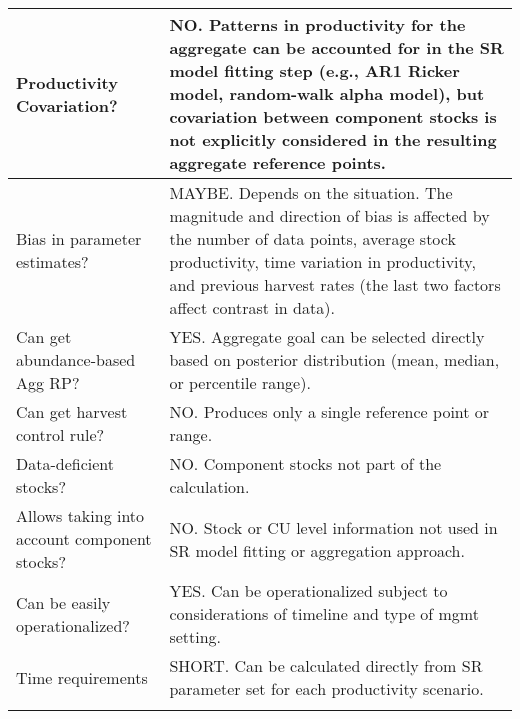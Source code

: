 \documentclass[french,11pt]{book}
\begin{document}
\begin{longtable}[t]{>{\raggedright\arraybackslash}p{9em}>{\raggedright\arraybackslash}p{37em}}
\midrule Productivity Covariation? & NO. Patterns in productivity for the aggregate can be accounted for in the SR model fitting step (e.g., AR1 Ricker model, random-walk alpha model), but covariation between component stocks is not explicitly considered in the resulting aggregate reference points.\\
\midrule Bias in parameter estimates? & MAYBE. Depends on the situation. The magnitude and direction of bias is affected by the number of data points, average stock productivity, time variation in productivity, and previous harvest rates (the last two factors affect contrast in data).\\
\midrule Can get abundance-based Agg RP? & YES.  Aggregate goal can be selected directly based on posterior distribution (mean, median, or percentile range).\\
\midrule Can get harvest control rule? & NO.  Produces only a single reference point or range.\\
\midrule Data-deficient stocks? & NO. Component stocks not part of the calculation.\\
\midrule Allows taking into account component stocks? & NO.  Stock or CU level information not used in SR model fitting or aggregation approach.\\
\midrule Can be easily operationalized? & YES. Can be operationalized subject to considerations of timeline and type of mgmt setting.\\
\midrule Time requirements & SHORT. Can be calculated directly from SR parameter set for each productivity scenario.\\* \end{longtable}

\endgroup{} \endgroup{}

\clearpage
\end{document}
